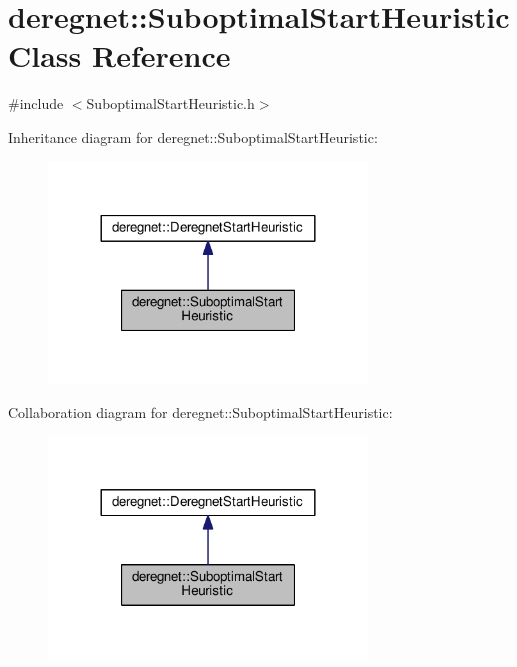 \hypertarget{classderegnet_1_1SuboptimalStartHeuristic}{}\section{deregnet\+:\+:Suboptimal\+Start\+Heuristic Class Reference}
\label{classderegnet_1_1SuboptimalStartHeuristic}


{\ttfamily \#include $<$Suboptimal\+Start\+Heuristic.\+h$>$}



Inheritance diagram for deregnet\+:\+:Suboptimal\+Start\+Heuristic\+:\nopagebreak
\begin{figure}[H]
\begin{center}
\leavevmode
\includegraphics[width=240pt]{classderegnet_1_1SuboptimalStartHeuristic__inherit__graph}
\end{center}
\end{figure}


Collaboration diagram for deregnet\+:\+:Suboptimal\+Start\+Heuristic\+:\nopagebreak
\begin{figure}[H]
\begin{center}
\leavevmode
\includegraphics[width=240pt]{classderegnet_1_1SuboptimalStartHeuristic__coll__graph}
\end{center}
\end{figure}
